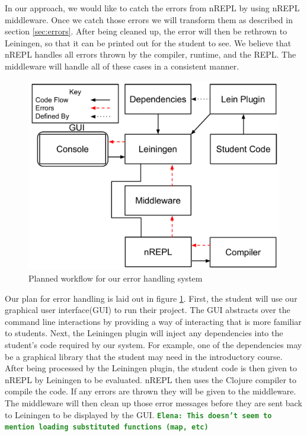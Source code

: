 \documentclass[12pt]{article}
\newcommand{\comment}[1]{{\bf \tt  {#1}}}
\newcommand{\emcomment}[1]{\textcolor{ForestGreen}{\comment{Elena: {#1}}}}
\begin{document}
In our approach, we would like to catch the errors from nREPL by using nREPL middleware. Once we catch those errors we will transform them as described in section \ref{sec:errors}. After being cleaned up, the error will then be rethrown to Leiningen, so that it can be printed out for the student to see. We believe that nREPL handles all errors thrown by the compiler, runtime, and the REPL. The middleware will handle all of these cases in a consistent manner.

\begin{figure}[h]
 \includegraphics[width=12cm]{OurErrorHandlingSystem.pdf}
 \centering
  \caption{Planned workflow for our error handling system}
 \label{fig:OurSystem}
\end{figure}

Our plan for error handling is laid out in figure \ref{fig:OurSystem}. First, the student will use our graphical user interface(GUI) to run their project. The GUI abstracts over the command line interactions by providing a way of interacting that is more familiar to students. Next, the Leiningen plugin will inject any dependencies into the student's code required by our system. For example, one of the dependencies may be a graphical library that the student may need in the introductory course. After being processed by the Leiningen plugin, the student code is then given to nREPL by Leiningen to be evaluated. nREPL then uses the Clojure compiler to compile the code. If any errors are thrown they will be given to the middleware. The middleware will then clean up those error messages before they are sent back to Leiningen to be displayed by the GUI.
\emcomment{This doesn't seem to mention loading substituted functions (map, etc)}
\end{document}
